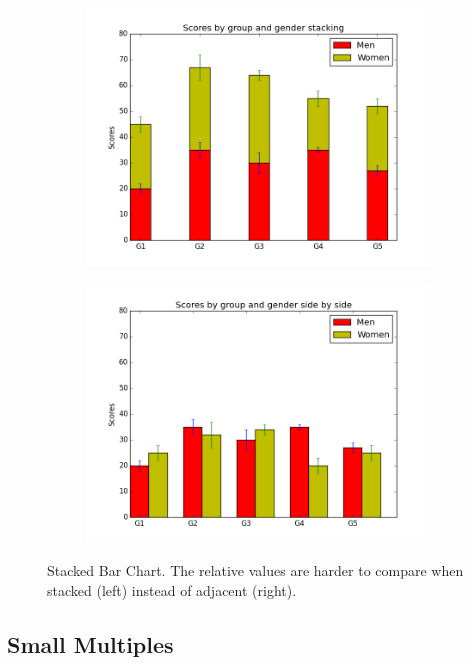 \begin{figure} %
\centering
\begin{subfigure}{.45\textwidth}
\centering
\includegraphics[width=\textwidth]{stackedbar.png}
\end{subfigure}
\begin{subfigure}{.45\textwidth}
\centering
\includegraphics[width=\textwidth]{unstackedbar.png}
\end{subfigure}
\caption{Stacked Bar Chart. The relative values are harder to compare when stacked (left) instead of adjacent (right).}
\label{fig:stacked}
\end{figure}

\subsection*{Small Multiples} %


